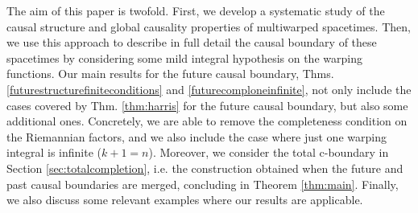


 \smallskip

 The aim of this paper is twofold. First, we develop a systematic study of the causal structure and global causality properties of multiwarped spacetimes. Then, we use this approach to describe in full detail the causal boundary of these spacetimes by considering some mild integral hypothesis on the warping functions. Our main results for the future causal boundary, Thms. \ref{futurestructurefiniteconditions} and \ref{futurecomploneinfinite}, not only include the cases covered by Thm. \ref{thm:harris} for the future causal boundary, but also some additional ones. Concretely, we are able to remove the completeness condition on the Riemannian factors, and we also include the case where just one warping integral is infinite ($k+1=n$). Moreover, we consider the total c-boundary in Section \ref{sec:totalcompletion}, i.e. the construction obtained when the future and past causal boundaries are merged, concluding in Theorem \ref{thm:main}.
 Finally, we also discuss some relevant examples where our results are applicable.

